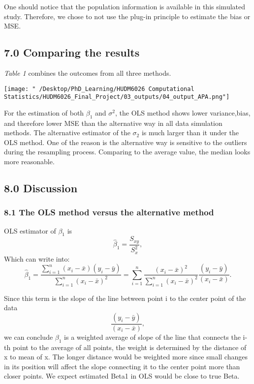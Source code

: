 \documentclass[
]{article}
\begin{document}
One should notice that the population information is available in this
simulated study. Therefore, we chose to not use the plug-in principle to
estimate the bias or MSE.

\hypertarget{comparing-the-results}{%
\subsection{7.0 Comparing the results}\label{comparing-the-results}}

\emph{Table 1} combines the outcomes from all three methods.

\texttt{[image: "~/Desktop/PhD\_Learning/HUDM6026 Computational Statistics/HUDM6026\_Final\_Project/03\_outputs/04\_output\_APA.png"]}

For the estimation of both \(\beta_1\) and \(\sigma^2\), the OLS method
shows lower variance,bias, and therefore lower MSE than the alternative
way in all data simulation methods. The alternative estimator of the
\(\sigma_2\) is much larger than it under the OLS method. One of the
reason is the alternative way is sensitive to the outliers during the
resampling process. Comparing to the average value, the median looks
more reasonable.

\hypertarget{discussion}{%
\subsection{8.0 Discussion}\label{discussion}}

\hypertarget{the-ols-method-versus-the-alternative-method}{%
\subsubsection{8.1 The OLS method versus the alternative
method}\label{the-ols-method-versus-the-alternative-method}}

OLS estimator of \(\beta_1\) is \[\hat\beta_1 = \frac{S_{xy}}{S_x^2},\]
Which can write
into:\[\hat\beta_1 =\frac{\sum_{i=1}^{n}(x_i-\bar{x})(y_i-\bar{y})}{\sum_{i=1}^{n}(x_i-\bar{x})^2} = \sum_{i=1}^{n}\frac{(x_i-\bar{x})^2}{\sum_{i=1}^{n}(x_i-\bar{x})^2}\frac{(y_i-\bar{y})}{(x_i-\bar{x})}. \]

Since this term is the slope of the line between point i to the center
point of the data \[\frac{(y_i-\bar{y})}{(x_i-\bar{x})},\] we can
conclude \(\beta_1\) is a weighted average of slope of the line that
connects the i-th point to the average of all points, the weight is
determined by the distance of x to mean of x. The longer distance would
be weighted more since small changes in its position will affect the
slope connecting it to the center point more than closer points. We
expect estimated Beta1 in OLS would be close to true Beta.
\end{document}
